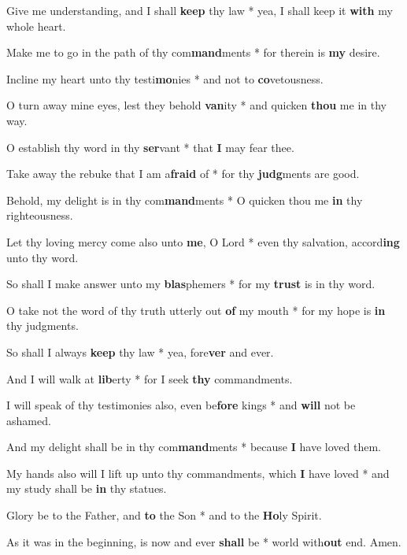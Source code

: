 \begin{multicols}{2}
	Give me understanding, and I shall \textbf{keep} thy law * yea, I shall keep it \textbf{with} my whole heart.
	
	Make me to go in the path of thy com\textbf{mand}ments * for therein is \textbf{my} desire.
	
	Incline my heart unto thy testi\textbf{mo}nies * and not to \textbf{co}vetousness.
	
	O turn away mine eyes, lest they behold \textbf{van}ity * and quicken \textbf{thou} me in thy way.
	
	O establish thy word in thy \textbf{ser}vant * that \textbf{I} may fear thee.
	
	Take away the rebuke that I am a\textbf{fraid} of * for thy \textbf{judg}ments are good.
	
	Behold, my delight is in thy com\textbf{mand}ments * O quicken thou me \textbf{in} thy righteousness.
	
	Let thy loving mercy come also unto \textbf{me}, O Lord * even thy salvation, accord\textbf{ing} unto thy word.
	
	So shall I make answer unto my \textbf{blas}phemers * for my \textbf{trust} is in thy word.
	
	O take not the word of thy truth utterly out \textbf{of} my mouth * for my hope is \textbf{in} thy judgments.
	
	So shall I always \textbf{keep} thy law * yea, fore\textbf{ver} and ever.
	
	And I will walk at \textbf{lib}erty * for I seek \textbf{thy} commandments.
	
	I will speak of thy testimonies also, even be\textbf{fore} kings * and \textbf{will} not be ashamed.
	
	And my delight shall be in thy com\textbf{mand}ments * because \textbf{I} have loved them.
	
	My hands also will I lift up unto thy commandments, which \textbf{I} have loved * and my study shall be \textbf{in} thy statues.
	
	Glory be to the Father, and \textbf{to} the Son * and to the \textbf{Ho}ly Spirit.
	
	As it was in the beginning, is now and ever \textbf{shall} be * world with\textbf{out} end. Amen.
\end{multicols}